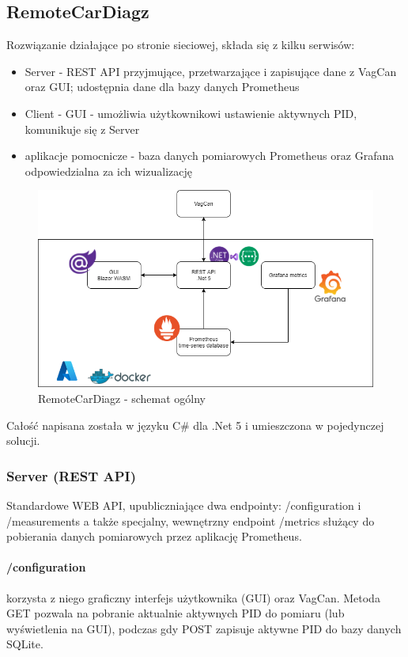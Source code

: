 \documentclass[10pt,a4paper]{scrartcl}
\begin{document}
		\subsection{RemoteCarDiagz}
		Rozwiązanie działające po stronie sieciowej, składa się z kilku serwisów:
		\begin{itemize}
			\item Server - REST API przyjmujące, przetwarzające i zapisujące dane z VagCan oraz GUI; udostępnia dane dla bazy danych Prometheus
			\item Client - GUI - umożliwia użytkownikowi ustawienie aktywnych PID, komunikuje się z Server
			\item aplikacje pomocnicze - baza danych pomiarowych Prometheus oraz Grafana odpowiedzialna za ich wizualizację
		\end{itemize}
		\begin{figure}[H]
			\centering
			\includegraphics[width=0.8\linewidth]{remoteCarDiagz_schema.drawio}
			\caption[RemoteCarDiagz- schemat ogólny]{RemoteCarDiagz - schemat ogólny}
			\label{fig:remotecardiagzschema}
		\end{figure}
		Całość napisana została w języku C\# dla .Net 5 i umieszczona w pojedynczej solucji. 
		\subsubsection{Server (REST API)}
		Standardowe WEB API, upubliczniające dwa endpointy: /configuration i /measurements a także specjalny, wewnętrzny endpoint /metrics służący do pobierania danych pomiarowych przez aplikację Prometheus.
		\paragraph{\slash configuration} korzysta z niego graficzny interfejs użytkownika (GUI) oraz VagCan. Metoda GET pozwala na pobranie aktualnie aktywnych PID do pomiaru (lub wyświetlenia na GUI), podczas gdy POST zapisuje aktywne PID do bazy danych SQLite.
\end{document}
